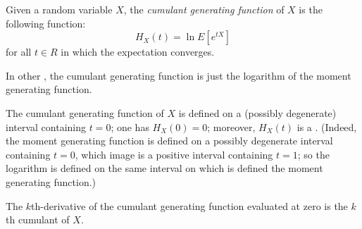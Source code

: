 \documentclass[12pt]{article}
\begin{document}
Given a random variable $X$, the \emph{cumulant generating function} of $X$ is the following function:\\
\[
H_X(t) = \ln E[e^{tX}]
\]
for all $t \in R$ in which the expectation converges.

In other , the cumulant generating function is just the logarithm of the moment generating function.

The cumulant generating function of $X$ is defined on a (possibly degenerate) interval containing $t=0$; one has $H_X(0)=0$; moreover, $H_X(t)$ is a . (Indeed, the moment generating function is defined on a possibly degenerate interval containing $t=0$, which image is a positive interval containing $t=1$; so the logarithm is defined on the same interval on which is defined the moment generating function.)

The $k$th-derivative of the cumulant generating function evaluated at zero is the $k$th cumulant of $X$.

\end{document}
